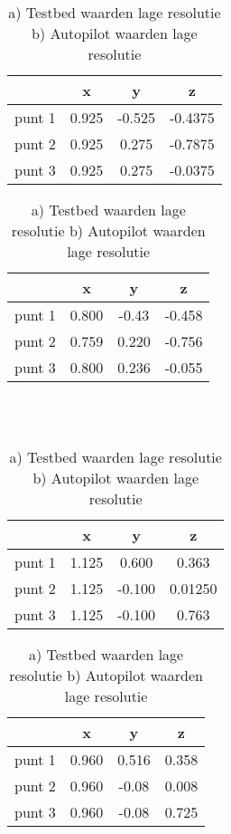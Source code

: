 \\\\
\begin{table}
 	\centering
 	\begin{tabular}{l|c|c|c}
 		& x & y & z \\ \hline
 		punt 1 & 0.925 & -0.525 & -0.4375 \\
 		punt 2 & 0.925 & 0.275 & -0.7875 \\
 		punt 3 & 0.925 & 0.275 & -0.0375
 	\end{tabular}
 	\begin{tabular}{l|c|c|c}
 		& x & y & z \\ \hline
 		punt 1 & 0.800 & -0.43 & -0.458 \\
 		punt 2 & 0.759 & 0.220 & -0.756 \\
 		punt 3 & 0.800 & 0.236 & -0.055
 	\end{tabular}
\caption{a) Testbed waarden lage resolutie  b) Autopilot waarden lage resolutie}
\end{table}
\\\\
\begin{table}
	\centering
	\begin{tabular}{l|c|c|c}
		& x & y & z \\ \hline
		punt 1 & 1.125 & 0.600 & 0.363 \\
		punt 2 & 1.125 & -0.100 & 0.01250 \\
		punt 3 & 1.125 & -0.100 & 0.763
	\end{tabular}
	\begin{tabular}{l|c|c|c}
		& x & y & z \\ \hline
		punt 1 & 0.960 & 0.516 & 0.358 \\
		punt 2 & 0.960 & -0.08 & 0.008 \\
		punt 3 & 0.960 & -0.08 & 0.725
	\end{tabular}
\caption{a) Testbed waarden lage resolutie  b) Autopilot waarden lage resolutie}
\end{table}